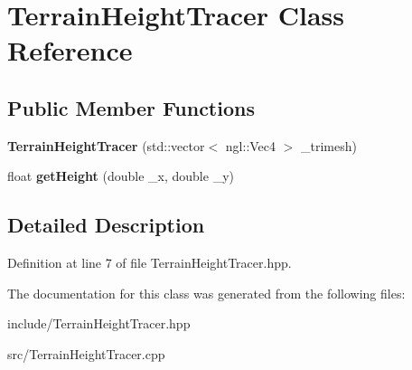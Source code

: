 \hypertarget{class_terrain_height_tracer}{}\section{Terrain\+Height\+Tracer Class Reference}
\label{class_terrain_height_tracer}
\subsection*{Public Member Functions}
\begin{DoxyCompactItemize}
\item 
\hypertarget{class_terrain_height_tracer_afb7344eea7fc3ffef7e2148b228433fd}{}{\bfseries Terrain\+Height\+Tracer} (std\+::vector$<$ ngl\+::\+Vec4 $>$ \+\_\+trimesh)\label{class_terrain_height_tracer_afb7344eea7fc3ffef7e2148b228433fd}

\item 
\hypertarget{class_terrain_height_tracer_a68c2f922d1ee4b64c4b9d79d25ca6533}{}float {\bfseries get\+Height} (double \+\_\+x, double \+\_\+y)\label{class_terrain_height_tracer_a68c2f922d1ee4b64c4b9d79d25ca6533}

\end{DoxyCompactItemize}


\subsection{Detailed Description}


Definition at line 7 of file Terrain\+Height\+Tracer.\+hpp.



The documentation for this class was generated from the following files\+:\begin{DoxyCompactItemize}
\item 
include/Terrain\+Height\+Tracer.\+hpp\item 
src/Terrain\+Height\+Tracer.\+cpp\end{DoxyCompactItemize}
